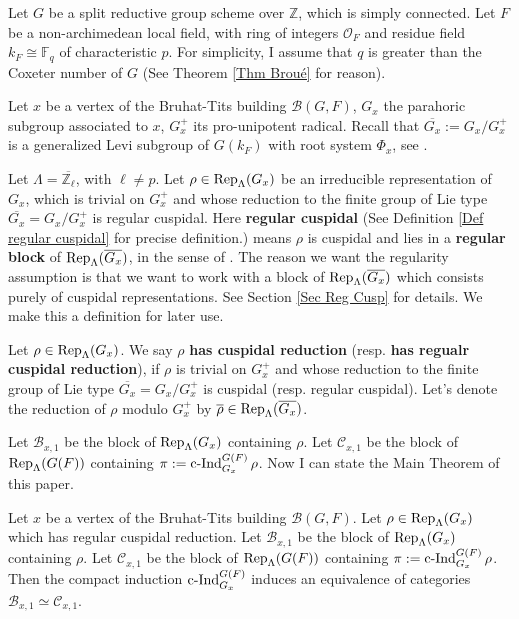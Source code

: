 	Let $G$ be a split reductive group scheme over $\mathbb{Z}$, which is simply connected. Let $F$ be a non-archimedean local field, with ring of integers $\mathcal{O}_F$ and residue field $k_F \cong \mathbb{F}_q$ of characteristic $p$. For simplicity, I assume that $q$ is greater than the Coxeter number of $G$ (See Theorem \ref{Thm Broué} for reason).
	
	Let $x$ be a vertex of the Bruhat-Tits building $\mathcal{B}(G, F)$, $G_x$ the parahoric subgroup associated to $x$, $G_x^+$ its pro-unipotent radical. Recall that $\overline{G_x}:=G_x/G_x^+$ is a generalized Levi subgroup of $G(k_F)$ with root system $\Phi_x$, see \cite[Theorem 3.17]{rabinoff2003bruhat}. 
	
	Let $\Lambda=\overline{\mathbb{Z}_\ell}$, with $\ell \neq p$. Let $\rho \in \operatorname{\operatorname{Rep}}_{\Lambda}(G_x)$ be an irreducible representation of $G_x$, which is trivial on $G_x^+$ and whose reduction to the finite group of Lie type $\overline{G_x}=G_x/G_x^+$ is  
	regular cuspidal. Here \textbf{regular cuspidal} (See Definition \ref{Def regular cuspidal} for precise definition.) means $\rho$ is cuspidal and lies in a \textbf{regular block} of $\operatorname{\operatorname{Rep}}_{\Lambda}(\overline{G_x})$, in the sense of \cite{broue1990isometries}. The reason we want the regularity assumption is that we want to work with a block of $\operatorname{\operatorname{Rep}}_{\Lambda}(\overline{G_x})$ which consists purely of cuspidal representations. See Section \ref{Sec Reg Cusp} for details. We make this a definition for later use.
	
	\begin{definition}
		Let $\rho \in \operatorname{\operatorname{Rep}}_{\Lambda}(G_x)$. We say $\rho$ \textbf{has cuspidal reduction} (resp. \textbf{has regualr cuspidal reduction}), if $\rho$ is trivial on $G_x^+$ and whose reduction to the finite group of Lie type $\overline{G_x}=G_x/G_x^+$ is cuspidal (resp. regular cuspidal). Let's denote the reduction of $\rho$ modulo $G_x^+$ by $\overline{\rho} \in \operatorname{\operatorname{Rep}}_{\Lambda}(\overline{G_x})$.
	\end{definition}
	
	Let $\mathcal{B}_{x,1}$ be the block of $\operatorname{\operatorname{Rep}}_{\Lambda}(G_x)$ containing $\rho$. Let $\mathcal{C}_{x,1}$ be the block of $\operatorname{\operatorname{Rep}}_{\Lambda}(G(F))$ containing $\pi:=\operatorname{\operatorname{c-Ind}}_{G_x}^{G(F)}\rho$. Now I can state the Main Theorem of this paper.
	
	\begin{theorem}\label{Thm Main}
		Let $x$ be a vertex of the Bruhat-Tits building $\mathcal{B}(G, F)$. Let $\rho \in \operatorname{\operatorname{Rep}}_{\Lambda}(G_x)$ which has regular cuspidal reduction. Let $\mathcal{B}_{x,1}$ be the block of $\operatorname{\operatorname{Rep}}_{\Lambda}(G_x)$ containing $\rho$. Let $\mathcal{C}_{x,1}$ be the block of $\operatorname{\operatorname{Rep}}_{\Lambda}(G(F))$ containing $\pi:=\operatorname{\operatorname{c-Ind}}_{G_x}^{G(F)}\rho$. Then the compact induction $\operatorname{\operatorname{c-Ind}}_{G_x}^{G(F)}$ induces an equivalence of categories $\mathcal{B}_{x,1} \simeq \mathcal{C}_{x,1}$. 
	\end{theorem}
	
